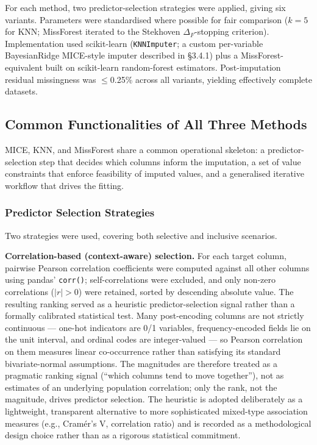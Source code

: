 For each method, two predictor-selection strategies were applied, giving six variants. Parameters were standardised where possible for fair comparison ($k = 5$ for KNN; MissForest iterated to the Stekhoven $\Delta_F$-stopping criterion). Implementation used scikit-learn (\texttt{KNNImputer}; a custom per-variable BayesianRidge MICE-style imputer described in \S3.4.1) plus a MissForest-equivalent built on scikit-learn random-forest estimators. Post-imputation residual missingness was $\leq$0.25\% across all variants, yielding effectively complete datasets.

\subsection{Common Functionalities of All Three Methods}

MICE, KNN, and MissForest share a common operational skeleton: a predictor-selection step that decides which columns inform the imputation, a set of value constraints that enforce feasibility of imputed values, and a generalised iterative workflow that drives the fitting.

\subsubsection{Predictor Selection Strategies}

Two strategies were used, covering both selective and inclusive scenarios.

\textbf{Correlation-based (context-aware) selection.} For each target column, pairwise Pearson correlation coefficients were computed against all other columns using pandas' \texttt{corr()}; self-correlations were excluded, and only non-zero correlations ($|r| > 0$) were retained, sorted by descending absolute value. The resulting ranking served as a heuristic predictor-selection signal rather than a formally calibrated statistical test. Many post-encoding columns are not strictly continuous --- one-hot indicators are 0/1 variables, frequency-encoded fields lie on the unit interval, and ordinal codes are integer-valued --- so Pearson correlation on them measures linear co-occurrence rather than satisfying its standard bivariate-normal assumptions. The magnitudes are therefore treated as a pragmatic ranking signal (``which columns tend to move together''), not as estimates of an underlying population correlation; only the rank, not the magnitude, drives predictor selection. The heuristic is adopted deliberately as a lightweight, transparent alternative to more sophisticated mixed-type association measures (e.g., Cram\'er's V, correlation ratio) and is recorded as a methodological design choice rather than as a rigorous statistical commitment.

